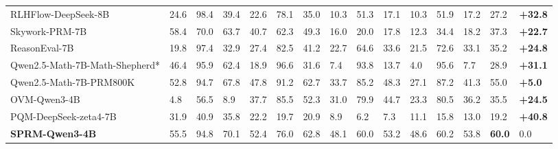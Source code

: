\begin{table}[t!]
{\begin{tabular}{@{}l*{12}{C{2.75em}}C{4.0em}C{2.9em}@{}}
RLHFlow-DeepSeek-8B & 24.6 & 98.4 & 39.4 & 22.6 & 78.1 & 35.0 & 10.3 & 51.3 & 17.1 & 10.3 & 51.9 & 17.2 & 27.2 & \textbf{+32.8} \\
Skywork-PRM-7B & 58.4 & 70.0 & 63.7 & 40.7 & 62.3 & 49.3 & 16.0 & 20.0 & 17.8 & 12.3 & 34.4 & 18.2 & 37.3 & \textbf{+22.7} \\
ReasonEval-7B & 19.8 & 97.4 & 32.9 & 27.4 & 82.5 & 41.2 & 22.7 & 64.6 & 33.6 & 21.5 & 72.6 & 33.1 & 35.2 & \textbf{+24.8} \\
Qwen2.5-Math-7B-Math-Shepherd* & 46.4 & 95.9 & 62.4 & 18.9 & 96.6 & 31.6 & 7.4 & 93.8 & 13.7 & 4.0 & 95.6 & 7.7 & 28.9 & \textbf{+31.1} \\
Qwen2.5-Math-7B-PRM800K & 52.8 & 94.7 & 67.8 & 47.8 & 91.2 & 62.7 & 33.7 & 85.2 & 48.3 & 27.1 & 87.2 & 41.3 & 55.0 & \textbf{+5.0} \\
OVM-Qwen3-4B & 4.8 & 56.5 & 8.9 & 37.7 & 85.5 & 52.3 & 31.0 & 79.9 & 44.7 & 23.3 & 80.5 & 36.2 & 35.5 & \textbf{+24.5} \\
PQM-DeepSeek-zeta4-7B & 31.9 & 40.9 & 35.8 & 22.2 & 19.7 & 20.9 & 8.9 & 6.2 & 7.3 & 11.1 & 15.8 & 13.0 & 19.2 & \textbf{+40.8} \\
\addlinespace[1pt]
\textbf{SPRM-Qwen3-4B} & 55.5 & 94.8 & 70.1 & 52.4 & 76.0 & 62.8 & 48.1 & 60.0 & 53.2 & 48.6 & 60.2 & 53.8 & \textbf{60.0} & 0.0 \\
\bottomrule
\end{tabular}%
}
\end{table}


